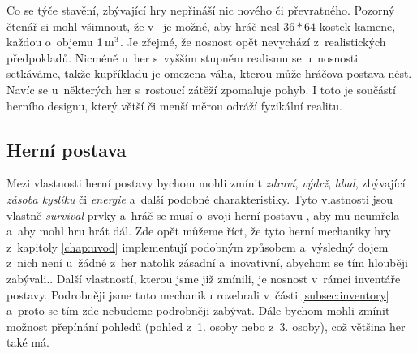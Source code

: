 Co se týče stavění, zbývající hry nepřináší nic nového či převratného. Pozorný čtenář si mohl všimnout, že v~ je možné, aby hráč nesl $36*64$ kostek kamene, každou o~objemu $1\,\rm m^3$. Je zřejmé, že nosnost opět nevychází z~realistických předpokladů. Nicméně u~her s~vyšším stupněm realismu se u~nosnosti setkáváme, takže kupříkladu je omezena váha, kterou může hráčova postava nést. Navíc se u~některých her s~rostoucí zátěží zpomaluje pohyb. I toto je součástí herního designu, který větší či menší měrou odráží fyzikální realitu.

\subsection{Herní postava}
Mezi vlastnosti herní postavy bychom mohli zmínit \textit{zdraví}, \textit{výdrž}, \textit{hlad}, zbývající \textit{zásoba kyslíku} či \textit{energie} a~další podobné charakteristiky. Tyto vlastnosti jsou vlastně \textit{survival} prvky a~hráč se musí o~svoji herní postavu , aby mu neumřela a~aby mohl hru hrát dál. Zde opět můžeme říct, že tyto herní mechaniky hry z~kapitoly \ref{chap:uvod} implementují podobným způsobem a~výsledný dojem z~nich není u~žádné z~her natolik zásadní a~inovativní, abychom se tím hlouběji zabývali..
Další vlastností, kterou jsme již zmínili, je nosnost v~rámci inventáře postavy. Podrobněji jsme tuto mechaniku rozebrali v~části \ref{subsec:inventory} a~proto se tím zde nebudeme podrobněji zabývat. 
Dále bychom mohli zmínit možnost přepínání pohledů (pohled z~1. osoby nebo z~3. osoby), což většina her také má. 


